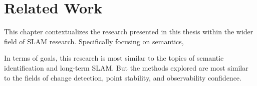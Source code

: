 \section{Related Work}
\label{sec:related_work}

This chapter contextualizes the research presented in this thesis within the wider field of SLAM research. Specifically focusing on semantics, 

In terms of goals, this research is most similar to the topics of semantic identification and long-term SLAM. But the methods explored are most similar to the fields of change detection, point stability, and observability confidence.


% 